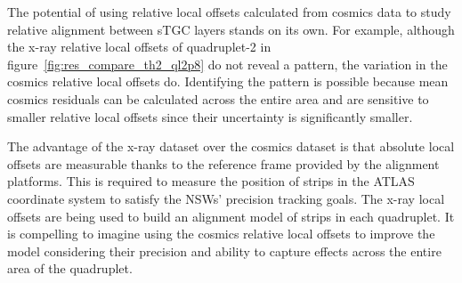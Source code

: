 The potential of using relative local offsets calculated from cosmics data to study relative alignment between sTGC layers stands on its own. For example, although the x-ray relative local offsets of quadruplet-2 in figure~\ref{fig:res_compare_th2_ql2p8} do not reveal a pattern, the variation in the cosmics relative local offsets do. Identifying the pattern is possible because mean cosmics residuals can be calculated across the entire area and are sensitive to smaller relative local offsets since their uncertainty is significantly smaller. 

The advantage of the x-ray dataset over the cosmics dataset is that absolute local offsets are measurable thanks to the reference frame provided by the alignment platforms. This is required to measure the position of strips in the ATLAS coordinate system to satisfy the NSWs' precision tracking goals. The x-ray local offsets are being used to build an alignment model of strips in each quadruplet. It is compelling to imagine using the cosmics relative local offsets to improve the model considering their precision and ability to capture effects across the entire area of the quadruplet.